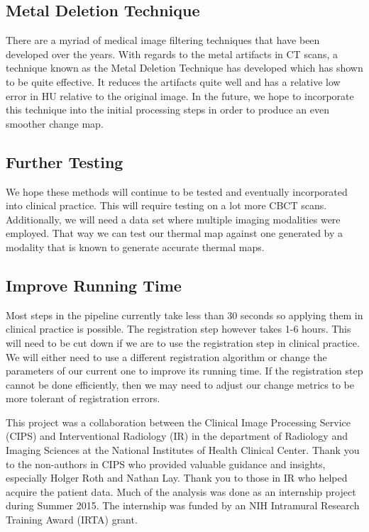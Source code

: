 \documentclass[]{spie}  %
\begin{document}
\subsection{Metal Deletion Technique}

There are a myriad of medical image filtering techniques that have been developed over the years. With regards to the metal artifacts in CT scans, a technique known as the Metal Deletion Technique \cite{Boas11} has developed which has shown to be quite effective. It reduces the artifacts quite well and has a relative low error in HU relative to the original image. In the future, we hope to incorporate this technique into the initial processing steps in order to produce an even smoother change map. 

\subsection{Further Testing}

We hope these methods will continue to be tested and eventually incorporated into clinical practice. This will require testing on a lot more CBCT scans. Additionally, we will need a data set where multiple imaging modalities were employed. That way we can test our thermal map against one generated by a modality that is known to generate accurate thermal maps.

\subsection{Improve Running Time}

Most steps in the pipeline currently take less than 30 seconds so applying them in clinical practice is possible. The registration step however takes 1-6 hours. This will need to be cut down if we are to use the registration step in clinical practice. We will either need to use a different registration algorithm or change the parameters of our current one to improve its running time. If the registration step cannot be done efficiently, then we may need to adjust our change metrics to be more tolerant of registration errors.  

\acknowledgements

This project was a collaboration between the Clinical Image Processing Service (CIPS) and Interventional Radiology (IR) in the department of Radiology and Imaging Sciences at the National Institutes of Health Clinical Center. Thank you to the non-authors in CIPS who provided valuable guidance and insights, especially Holger Roth and Nathan Lay. Thank you to those in IR who helped acquire the patient data. Much of the analysis was done as an internship project during Summer 2015. The internship was funded by an NIH Intramural Research Training Award (IRTA) grant. 

\end{document}
